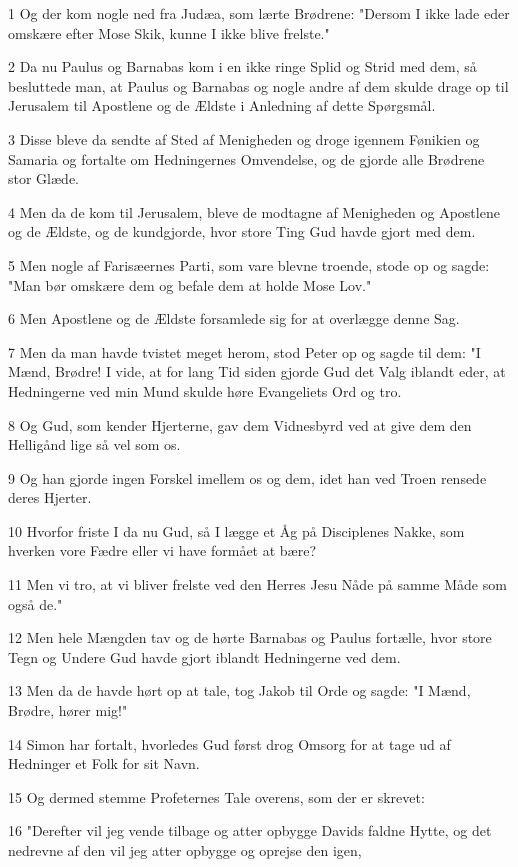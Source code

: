 \par 1 Og der kom nogle ned fra Judæa, som lærte Brødrene: "Dersom I ikke lade eder omskære efter Mose Skik, kunne I ikke blive frelste."
\par 2 Da nu Paulus og Barnabas kom i en ikke ringe Splid og Strid med dem, så besluttede man, at Paulus og Barnabas og nogle andre af dem skulde drage op til Jerusalem til Apostlene og de Ældste i Anledning af dette Spørgsmål.
\par 3 Disse bleve da sendte af Sted af Menigheden og droge igennem Fønikien og Samaria og fortalte om Hedningernes Omvendelse, og de gjorde alle Brødrene stor Glæde.
\par 4 Men da de kom til Jerusalem, bleve de modtagne af Menigheden og Apostlene og de Ældste, og de kundgjorde, hvor store Ting Gud havde gjort med dem.
\par 5 Men nogle af Farisæernes Parti, som vare blevne troende, stode op og sagde: "Man bør omskære dem og befale dem at holde Mose Lov."
\par 6 Men Apostlene og de Ældste forsamlede sig for at overlægge denne Sag.
\par 7 Men da man havde tvistet meget herom, stod Peter op og sagde til dem: "I Mænd, Brødre! I vide, at for lang Tid siden gjorde Gud det Valg iblandt eder, at Hedningerne ved min Mund skulde høre Evangeliets Ord og tro.
\par 8 Og Gud, som kender Hjerterne, gav dem Vidnesbyrd ved at give dem den Helligånd lige så vel som os.
\par 9 Og han gjorde ingen Forskel imellem os og dem, idet han ved Troen rensede deres Hjerter.
\par 10 Hvorfor friste I da nu Gud, så I lægge et Åg på Disciplenes Nakke, som hverken vore Fædre eller vi have formået at bære?
\par 11 Men vi tro, at vi bliver frelste ved den Herres Jesu Nåde på samme Måde som også de."
\par 12 Men hele Mængden tav og de hørte Barnabas og Paulus fortælle, hvor store Tegn og Undere Gud havde gjort iblandt Hedningerne ved dem.
\par 13 Men da de havde hørt op at tale, tog Jakob til Orde og sagde: "I Mænd, Brødre, hører mig!"
\par 14 Simon har fortalt, hvorledes Gud først drog Omsorg for at tage ud af Hedninger et Folk for sit Navn.
\par 15 Og dermed stemme Profeternes Tale overens, som der er skrevet:
\par 16 "Derefter vil jeg vende tilbage og atter opbygge Davids faldne Hytte, og det nedrevne af den vil jeg atter opbygge og oprejse den igen,
